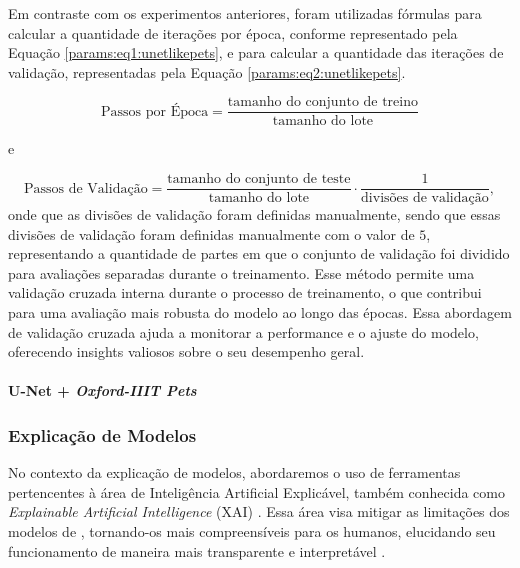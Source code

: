 Em contraste com os experimentos anteriores, foram utilizadas fórmulas para calcular a quantidade de iterações por época, conforme representado pela Equação \ref{params:eq1:unetlikepets}, e para calcular a quantidade das iterações de validação, representadas pela Equação \ref{params:eq2:unetlikepets}.

\begin{equation}
    \label{params:eq1:unetlikepets}
    \text{Passos por Época} = \frac{\text{tamanho do conjunto de treino}}{\text{tamanho do lote}}
\end{equation}

e

\begin{equation}
    \label{params:eq2:unetlikepets}
    \text{Passos de Validação} = \frac{\text{tamanho do conjunto de teste}}{\text{tamanho do lote}} \cdot \frac{1}{\text{divisões de validação}},
\end{equation}
onde que as divisões de validação foram definidas manualmente, sendo que essas divisões de validação foram definidas manualmente com o valor de $5$, representando a quantidade de partes em que o conjunto de validação foi dividido para avaliações separadas durante o treinamento. Esse método permite uma validação cruzada interna durante o processo de treinamento, o que contribui para uma avaliação mais robusta do modelo ao longo das épocas. Essa abordagem de validação cruzada ajuda a monitorar a performance e o ajuste do modelo, oferecendo insights valiosos sobre o seu desempenho geral.


\paragraph{U-Net + \textit{Oxford-IIIT Pets}}
\label{params:unetpets}


\subsubsection{Explicação de Modelos}
\label{project:explain}
No contexto da explicação de modelos, abordaremos o uso de ferramentas pertencentes à área de Inteligência Artificial Explicável, também conhecida como \textit{Explainable Artificial Intelligence} (XAI) \citep{Gunning2019XAIExplainableIntelligence}. Essa área visa mitigar as limitações dos modelos de , tornando-os mais compreensíveis para os humanos, elucidando seu funcionamento de maneira mais transparente e interpretável \citep{Angelov2021ExplainableReview}.

